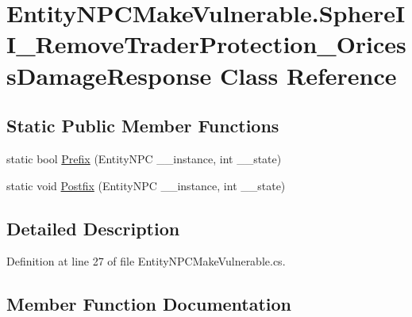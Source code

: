 \hypertarget{class_entity_n_p_c_make_vulnerable_1_1_sphere_i_i___remove_trader_protection___oricess_damage_response}{}\section{Entity\+N\+P\+C\+Make\+Vulnerable.\+Sphere\+I\+I\+\_\+\+Remove\+Trader\+Protection\+\_\+\+Oricess\+Damage\+Response Class Reference}
\label{class_entity_n_p_c_make_vulnerable_1_1_sphere_i_i___remove_trader_protection___oricess_damage_response}
\subsection*{Static Public Member Functions}
\begin{DoxyCompactItemize}
\item 
static bool \mbox{\hyperlink{class_entity_n_p_c_make_vulnerable_1_1_sphere_i_i___remove_trader_protection___oricess_damage_response_a75138d0ba7a0dcccee168f84e3002b50}{Prefix}} (Entity\+N\+PC \+\_\+\+\_\+instance, int \+\_\+\+\_\+state)
\item 
static void \mbox{\hyperlink{class_entity_n_p_c_make_vulnerable_1_1_sphere_i_i___remove_trader_protection___oricess_damage_response_a058d5940faf47943c2f90e75351063e0}{Postfix}} (Entity\+N\+PC \+\_\+\+\_\+instance, int \+\_\+\+\_\+state)
\end{DoxyCompactItemize}


\subsection{Detailed Description}


Definition at line 27 of file Entity\+N\+P\+C\+Make\+Vulnerable.\+cs.



\subsection{Member Function Documentation}
\mbox{\label{class_entity_n_p_c_make_vulnerable_1_1_sphere_i_i___remove_trader_protection___oricess_damage_response_a058d5940faf47943c2f90e75351063e0}} 
